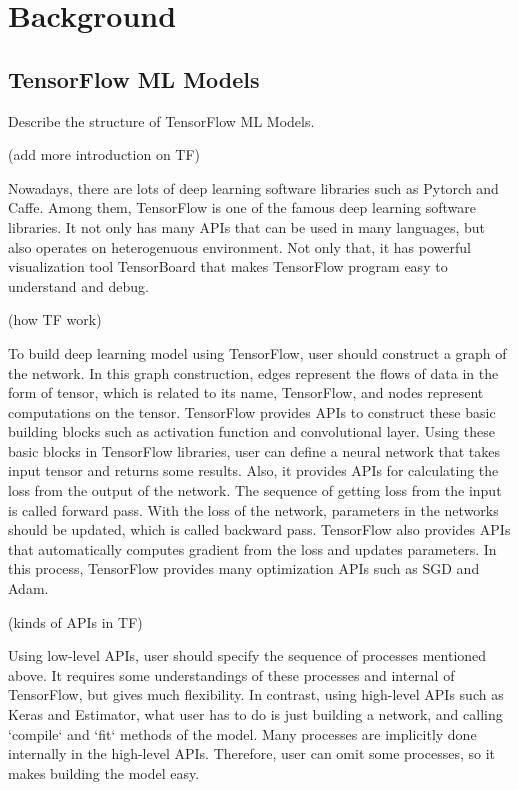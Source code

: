 \section{Background}\label{sec:background}
\subsection{TensorFlow ML Models}
Describe the structure of TensorFlow ML Models.

(add more introduction on TF)

Nowadays, there are lots of deep learning software libraries
such as Pytorch and Caffe.
Among them, TensorFlow is one of the famous deep learning software libraries.
It not only has many APIs that can be used in many languages,
but also operates on heterogenuous environment\cite{199317}.
Not only that, it has powerful visualization tool TensorBoard
that makes TensorFlow program easy to understand and debug.

(how TF work\cite{doi:10.3102/1076998619872761})

To build deep learning model using TensorFlow,
user should construct a graph of the network.
In this graph construction, edges represent the flows of data in the form of tensor,
which is related to its name, TensorFlow,
and nodes represent computations on the tensor.
TensorFlow provides APIs to construct these basic building blocks
such as activation function and convolutional layer.
Using these basic blocks in TensorFlow libraries, user can define a neural network
that takes input tensor and returns some results.
Also, it provides APIs for calculating the loss from the output of the network.
The sequence of getting loss from the input is called forward pass.
With the loss of the network, parameters in the networks should be updated,
which is called backward pass.
TensorFlow also provides APIs that automatically computes gradient from the loss
and updates parameters.
In this process, TensorFlow provides many optimization APIs
such as SGD and Adam.

(kinds of APIs in TF\cite{doi:10.3102/1076998619872761})

Using low-level APIs, user should specify the sequence of processes mentioned above.
It requires some understandings of these processes and internal of TensorFlow,
but gives much flexibility.
In contrast, using high-level APIs such as Keras and Estimator,
what user has to do is just building a network,
and calling `compile` and `fit` methods of the model.
Many processes are implicitly done internally in the high-level APIs.
Therefore, user can omit some processes, so it makes building the model easy.


